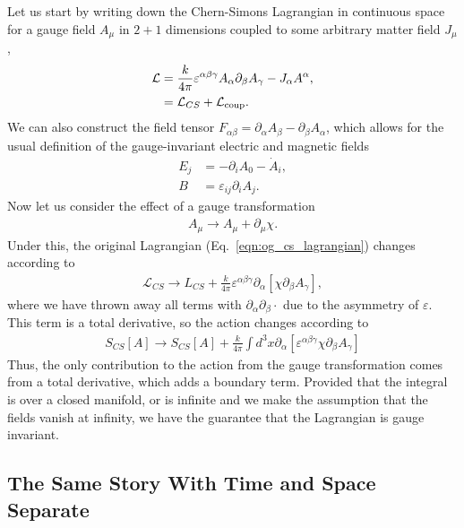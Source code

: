 \documentclass[11pt, oneside]{article} %
\numberwithin{equation}{section}
\begin{document}
Let us start by writing down the Chern-Simons Lagrangian in continuous space for a gauge field $A_\mu$ in $2+1$ dimensions coupled to some arbitrary matter field $J_\mu$,
\begin{align}\label{eqn:og_cs_lagrangian}
    \mathcal L &= \frac{k}{4\pi} 
    \varepsilon^{\alpha \beta \gamma}
    A_{\alpha} \partial_{\beta} A_{\gamma} - J_{\alpha }A^{\alpha}, \\ 
    & = \mathcal L_{CS} + \mathcal L_{\textup{coup}}.
\end{align}
We can also construct the field tensor $F_{\alpha \beta} = \partial_\alpha A_\beta - \partial_\beta A_\alpha$, which allows for the usual definition of the gauge-invariant electric and magnetic fields
\begin{align}
    E_j &= - \partial_i A_0 - \dot A_i, \\
    B &= \varepsilon_{ij}\partial_i A_j .
\end{align}
Now let us consider the effect of a gauge transformation
\begin{align}
    A_\mu \rightarrow A_\mu + \partial_\mu \chi.
\end{align}
Under this, the original Lagrangian (Eq.~\ref{eqn:og_cs_lagrangian}) changes according to 
\begin{align} \label{eqn:symmetric_change_lagrangian}
    \mathcal L_{CS} \rightarrow  L_{CS} + \frac k {4\pi}
    \varepsilon^{\alpha \beta \gamma} 
    \partial_\alpha \left [ 
    \chi \partial_\beta A_\gamma
    \right ],
\end{align}
where we have thrown away all terms with $\partial_\alpha \partial _\beta \cdot$ due to the asymmetry of $\varepsilon$. This term is a total derivative, so the action changes according to
\begin{align}
    S_{CS}[A] \rightarrow S_{CS}[A] + \frac k {4\pi} \int d^3x 
    \partial_\alpha \left [ 
    \varepsilon^{\alpha \beta \gamma} 
    \chi \partial_\beta A_\gamma
    \right ]
\end{align}
Thus, the only contribution to the action from the gauge transformation comes from a total derivative, which adds a boundary term. Provided that the integral is over a closed manifold, or is infinite and we make the assumption that the fields vanish at infinity, we have the guarantee that the Lagrangian is gauge invariant.

\subsection{The Same Story With Time and Space Separate} \label{sec:continuous_special_time}
\end{document}
